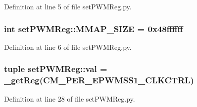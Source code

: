 \-Definition at line 5 of file set\-P\-W\-M\-Reg.\-py.

\hypertarget{namespaceset_p_w_m_reg_a623132b666b04c9f871f6af5afe56a74}{
\subsubsection[{\-M\-M\-A\-P\-\_\-\-S\-I\-Z\-E}]{\setlength{\rightskip}{0pt plus 5cm}int {\bf set\-P\-W\-M\-Reg\-::\-M\-M\-A\-P\-\_\-\-S\-I\-Z\-E} = 0x48ffffff}}\label{namespaceset_p_w_m_reg_a623132b666b04c9f871f6af5afe56a74}


\-Definition at line 6 of file set\-P\-W\-M\-Reg.\-py.

\hypertarget{namespaceset_p_w_m_reg_ad3cd16cb2c1d30a09867a4ba55ed109b}{
\subsubsection[{val}]{\setlength{\rightskip}{0pt plus 5cm}tuple {\bf set\-P\-W\-M\-Reg\-::val} = \-\_\-get\-Reg({\bf \-C\-M\-\_\-\-P\-E\-R\-\_\-\-E\-P\-W\-M\-S\-S1\-\_\-\-C\-L\-K\-C\-T\-R\-L})}}\label{namespaceset_p_w_m_reg_ad3cd16cb2c1d30a09867a4ba55ed109b}


\-Definition at line 28 of file set\-P\-W\-M\-Reg.\-py.

